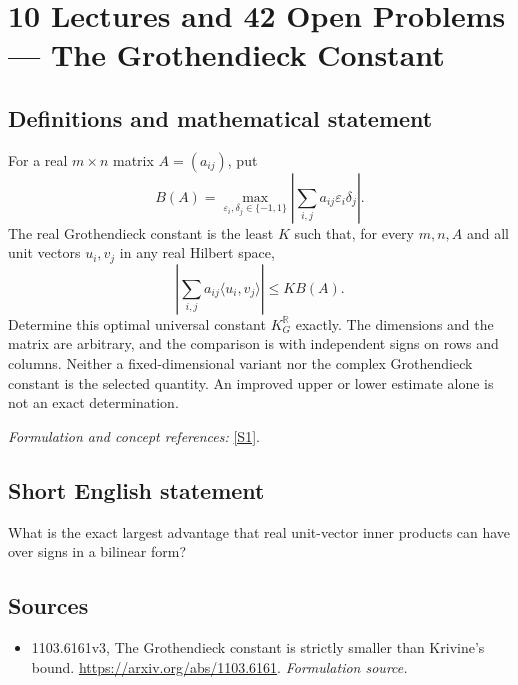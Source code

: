 \documentclass[11pt]{article}
\begin{document}
\section*{\texorpdfstring{10 Lectures and 42 Open Problems — The Grothendieck Constant}{10 Lectures and 42 Open Problems — The Grothendieck Constant}}\label{2800803}
\subsection{Definitions and mathematical statement}
For a real $m\times n$ matrix $A=(a_{ij})$, put
\[
 B(A)=\max_{{\varepsilon}_i,\delta_j\in\{-1,1\}}
 \left|\sum_{i,j}a_{ij}{\varepsilon}_i\delta_j\right|.
\]
The real Grothendieck constant is the least $K$ such that, for every $m,n,A$ and all unit vectors $u_i,v_j$ in any real Hilbert space,
\[
 \left|\sum_{i,j}a_{ij}\langle u_i,v_j\rangle\right|\le K B(A).
\]
Determine this optimal universal constant $K_G^{{\mathbb{R}}}$ exactly. The dimensions and the matrix are arbitrary, and the comparison is with independent signs on rows and columns. Neither a fixed-dimensional variant nor the complex Grothendieck constant is the selected quantity. An improved upper or lower estimate alone is not an exact determination.
\par\smallskip\textit{Formulation and concept references:} \href{https://arxiv.org/abs/1103.6161}{[S1]}.

\subsection{Short English statement}
What is the exact largest advantage that real unit-vector inner products can have over signs in a bilinear form?
\subsection{Sources}
\begin{itemize}
\item[S1]1103.6161v3, The Grothendieck constant is strictly smaller than Krivine's bound.
\url{https://arxiv.org/abs/1103.6161}.
\textit{Formulation source.}
\end{itemize}
\end{document}
